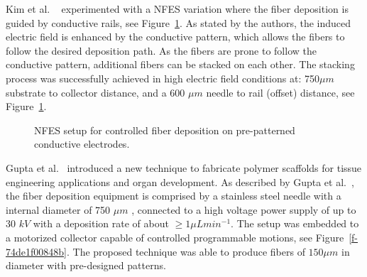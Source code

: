 \documentclass[5p,,preprint,12pt,twocolumn]{elsarticle}
\makeatletter
\def\fixFloatSize#1{}%
\makeatother
\begin{document}
Kim et al. \unskip~\cite{527120:11974313} experimented with a NFES variation where the fiber deposition is guided by conductive rails, see Figure~\ref{f-927e96fb5537}. As stated by the authors, the induced electric field is enhanced by the conductive pattern, which allows the fibers to follow the desired deposition path. As the fibers are prone to follow the conductive pattern, additional fibers can be stacked on each other. The stacking process was successfully achieved in high electric field conditions at: 750$\mu m $ substrate to collector distance, and a 600 $\mu m $ needle to rail (offset) distance, see Figure~\ref{f-927e96fb5537}.


\bgroup
\fixFloatSize{images/0fd23deb-7631-4b09-8641-69fc6ac8a6b5-ukim_00.png}
\begin{figure}[!htbp]
\centering \makeatletter{}
\makeatother 
\caption{{NFES setup for controlled fiber deposition on pre-patterned conductive electrodes. \unskip~\protect\cite{527120:11974313}}}
\label{f-927e96fb5537}
\end{figure}
\egroup
Gupta et al.\unskip~\cite{527120:11974310} introduced a new technique to fabricate polymer scaffolds for tissue engineering applications and organ development. As described by Gupta et al.\unskip~\cite{527120:11974310}, the fiber deposition equipment is comprised by a stainless steel needle with a internal diameter of 750 $\mu m $ , connected to a high voltage power supply of up to 30 $k V $ with a deposition rate of about $\geq 1 \mu L min^{-1} $. The setup was embedded to a motorized collector capable of controlled programmable motions, see Figure~\ref{f-74de1f00848b}. The proposed technique was able to produce fibers of $150 \mu m $ in diameter with pre-designed patterns.
\end{document}
